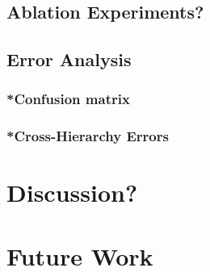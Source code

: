 \subsection{Ablation Experiments?}
\subsection{Error Analysis}
\subsubsection{*Confusion matrix}
\subsubsection{*Cross-Hierarchy Errors}

\section{Discussion?}

\section{Future Work}

